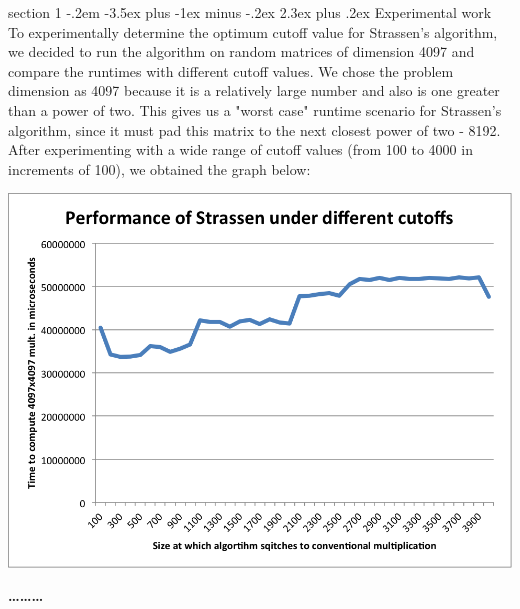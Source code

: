 \documentclass[12pt]{article}
\makeatletter
\newenvironment{problem}{\@startsection
       {section}
       {1}
       {-.2em}
       {-3.5ex plus -1ex minus -.2ex}
       {2.3ex plus .2ex}
       {\pagebreak[3]%
       \large\bf\noindent{Problem }
       }
       }
       {%
       \begin{center}\large\bf \ldots\ldots\ldots\end{center}}
\makeatother
\begin{document}
\begin{problem}{}
Experimental work\\

\noindent To experimentally determine the optimum cutoff value for Strassen's algorithm, we decided to run the algorithm on random matrices of dimension 4097 and compare the runtimes with different cutoff values.  We chose the problem dimension as 4097 because it is a relatively large number and also is one greater than a power of two.  This gives us a "worst case" runtime scenario for Strassen's algorithm, since it must pad this matrix to the next closest power of two - 8192.\\

\noindent After experimenting with a wide range of cutoff values (from 100 to 4000 in increments of 100), we obtained the graph below:
\begin{center}
\includegraphics[scale=0.8]{figs/benchmark-1.png}
\end{center}


\end{problem}
\end{document}
